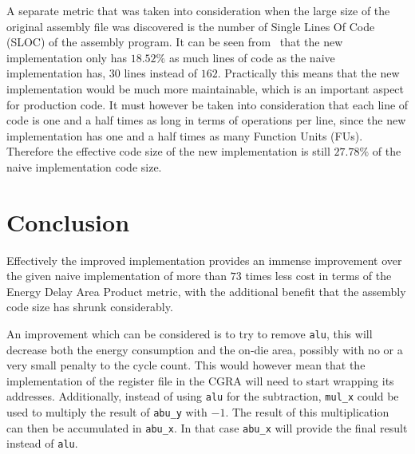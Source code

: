 \documentclass[10pt,twocolumn]{article}
\begin{document}
A separate metric that was taken into consideration when the large
size of the original assembly file was discovered is the number of
Single Lines Of Code (SLOC) of the assembly program. It can be seen
from~ that the new implementation only has $18.52\%$
as much lines of code as the naive implementation has, $30$ lines
instead of $162$. Practically this means that the new implementation
would be much more maintainable, which is an important aspect for
production code. It must however be taken into consideration that each
line of code is one and a half times as long in terms of operations
per line, since the new implementation has one and a half times as
many Function Units (FUs). Therefore the effective code size of the
new implementation is still $27.78\%$ of the naive implementation code
size.


\section{Conclusion}
Effectively the improved implementation provides an immense
improvement over the given naive implementation of more than $73$
times less cost in terms of the Energy Delay Area Product metric, with
the additional benefit that the assembly code size has shrunk
considerably.

An improvement which can be considered is to try to remove
\texttt{alu}, this will decrease both the energy consumption and the
on-die area, possibly with no or a very small penalty to the cycle
count. This would however mean that the implementation of the register
file in the CGRA will need to start wrapping its addresses.
Additionally, instead of using \texttt{alu} for the subtraction,
\texttt{mul\_x} could be used to multiply the result of
\texttt{abu\_y} with $-1$. The result of this multiplication can then
be accumulated in \texttt{abu\_x}. In that case \texttt{abu\_x} will
provide the final result instead of \texttt{alu}.
\end{document}
